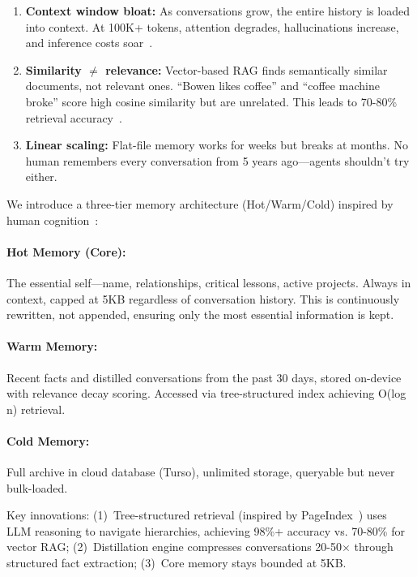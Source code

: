 \documentclass{article}
\begin{document}
\begin{enumerate}[leftmargin=*]
    \item \textbf{Context window bloat:} As conversations grow, the entire history is loaded into context. At 100K+ tokens, attention degrades, hallucinations increase, and inference costs soar~\cite{tai2022retrieval}.
    
    \item \textbf{Similarity $\neq$ relevance:} Vector-based RAG finds semantically similar documents, not relevant ones. ``Bowen likes coffee'' and ``coffee machine broke'' score high cosine similarity but are unrelated. This leads to 70-80\% retrieval accuracy~\cite{karpukhin2020dense}.
    
    \item \textbf{Linear scaling:} Flat-file memory works for weeks but breaks at months. No human remembers every conversation from 5 years ago---agents shouldn't try either.
\end{enumerate}

We introduce a three-tier memory architecture (Hot/Warm/Cold) inspired by human cognition~\cite{atkinson1971human}:

\paragraph{Hot Memory (Core):} The essential self---name, relationships, critical lessons, active projects. Always in context, capped at 5KB regardless of conversation history. This is continuously rewritten, not appended, ensuring only the most essential information is kept.

\paragraph{Warm Memory:} Recent facts and distilled conversations from the past 30 days, stored on-device with relevance decay scoring. Accessed via tree-structured index achieving O(log n) retrieval.

\paragraph{Cold Memory:} Full archive in cloud database (Turso), unlimited storage, queryable but never bulk-loaded.

Key innovations: (1)~Tree-structured retrieval (inspired by PageIndex~\cite{vectifyai_pageindex}) uses LLM reasoning to navigate hierarchies, achieving 98\%+ accuracy vs. 70-80\% for vector RAG; (2)~Distillation engine compresses conversations 20-50$\times$ through structured fact extraction; (3)~Core memory stays bounded at 5KB.
\end{document}
